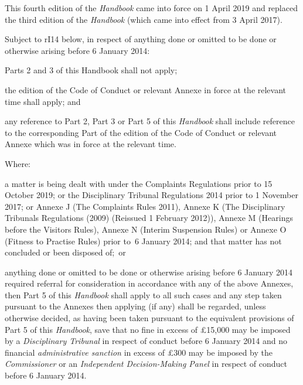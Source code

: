 


This fourth edition of the \emph{Handbook} came into force on 1 April
2019 and replaced the third edition of the \emph{Handbook} (which came
into effect from 3 April 2017).


Subject to rI14 below, in respect of anything done or omitted to be done
or otherwise arising before 6 January 2014:
\begin{numlist}
\item Parts 2 and 3 of this Handbook shall not apply;
\item the edition of the Code of Conduct or relevant Annexe in force at the
relevant time shall apply; and
\item any reference to Part 2, Part 3 or Part 5 of this \emph{Handbook}
shall include reference to the corresponding Part of the edition of the
Code of Conduct or relevant Annexe which was in force at the relevant
time.
\end{numlist}


Where:
\begin{numlist}
\item a matter is being dealt with under the Complaints Regulations prior
to 15 October 2019; or the Disciplinary Tribunal Regulations 2014 prior
to 1 November 2017; or Annexe J (The Complaints Rules 2011), Annexe K
(The Disciplinary Tribunals Regulations (2009) (Reissued 1 February
2012)), Annexe M (Hearings before the Visitors Rules), Annexe N (Interim
Suspension Rules) or Annexe O (Fitness to Practise Rules) prior to~6
January 2014; and that matter has not concluded or been disposed of;~or
\item anything done or omitted to be done or otherwise arising before 6
January 2014 required referral for consideration in accordance with any
of the above Annexes, then Part 5 of this \emph{Handbook} shall apply to
all such cases and any step taken pursuant to the Annexes then applying
(if any) shall be regarded, unless otherwise decided, as having been
taken pursuant to the equivalent provisions of Part 5 of this
\emph{Handbook}, save that no fine in excess of £15,000 may be imposed
by a \emph{Disciplinary Tribunal} in respect of conduct before 6 January
2014 and no financial \emph{administrative sanction} in excess of £300
may be imposed by the \emph{Commissioner} or an \emph{Independent
Decision-Making Panel} in respect of conduct before 6 January 2014.
\end{numlist}


